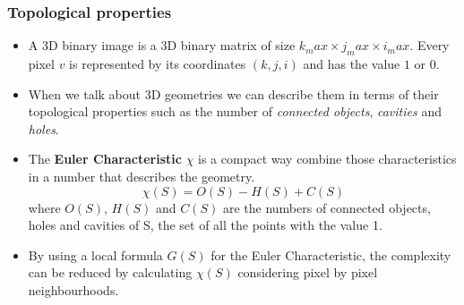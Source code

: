 \begin{frame}
  \frametitle{Topological properties}
  \begin{itemize}
    \item A 3D binary image is a 3D binary matrix of size $k_max \times j_max \times i_max$. Every pixel $v$ is represented by its coordinates $(k, j, i)$ and has the value $1$ or $0$.
    \item When we talk about 3D geometries we can describe them in terms of their topological properties such as the number of \emph{connected objects}, \emph{cavities} and \emph{holes}.
    \item The \textbf{Euler Characteristic} $\chi$ is a compact way combine those characteristics in a number that describes the geometry.
          \begin{equation}
            \chi(S) = O(S) - H(S) + C(S)
          \end{equation}
          where $O(S)$, $H(S)$ and $C(S)$ are the numbers of connected objects, holes and cavities of S, the set of all the points with the value 1.
    \item By using a local formula $G(S)$ for the Euler Characteristic, the complexity can be reduced by calculating $\chi(S)$ considering pixel by pixel neighbourhoods.
  \end{itemize}
\end{frame}
